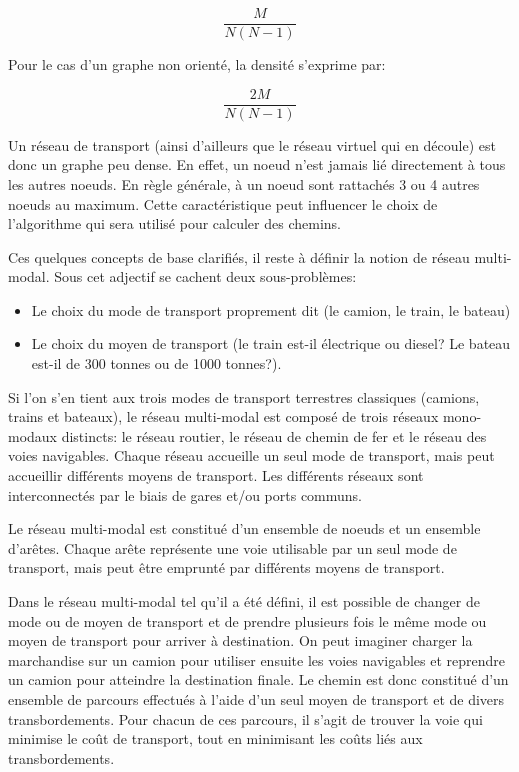 $$\frac{M}{N(N-1)} $$

Pour le cas d'un graphe non orienté, la densité s'exprime par:

$$\frac{2M}{N(N-1)} $$

Un réseau de transport (ainsi d'ailleurs que le réseau virtuel qui en découle)
est donc un graphe peu dense. En effet, un noeud n'est jamais lié directement à
tous les autres noeuds. En règle générale, à un noeud sont rattachés 3 ou 4
autres noeuds au maximum. Cette caractéristique peut influencer le choix de
l'algorithme qui sera utilisé pour calculer des chemins.

Ces quelques concepts de base clarifiés, il reste à définir la
notion de réseau multi-modal. Sous cet adjectif se cachent deux
sous-problèmes:


\begin{itemize}
\item  Le choix du mode de transport proprement dit (le camion, le
train, le bateau)
\item Le choix du moyen de transport (le train est-il électrique ou diesel?
Le bateau est-il de 300 tonnes ou de 1000 tonnes?).
\end{itemize}

Si l'on s'en tient aux trois modes de transport terrestres classiques (camions,
trains et bateaux), le réseau multi-modal est composé de trois réseaux
mono-modaux distincts: le réseau routier, le réseau de chemin de fer et le
réseau des voies navigables. Chaque réseau accueille un seul mode de transport,
mais peut accueillir différents moyens de transport. Les différents réseaux sont
inter\-connectés par le biais de gares et/ou ports communs.

Le réseau multi-modal est constitué d'un ensemble de noeuds et un
ensemble d'arêtes. Chaque arête représente une voie utilisable par
un seul mode de trans\-port, mais peut être emprunté par différents
moyens de transport.

Dans le réseau multi-modal tel qu'il a été défini, il est possible de changer de
mode ou de moyen de transport et de prendre plusieurs fois le même mode ou moyen
de transport pour arriver à destination. On peut imaginer charger la marchandise
sur un camion pour utiliser ensuite les voies navigables et reprendre un camion
pour atteindre la destination finale. Le chemin est donc constitué d'un ensemble
de parcours effectués à l'aide d'un seul moyen de transport et de divers
transbordements. Pour chacun de ces parcours, il s'agit de trouver la voie qui
minimise le coût de transport, tout en minimisant les coûts liés aux
transbordements.



